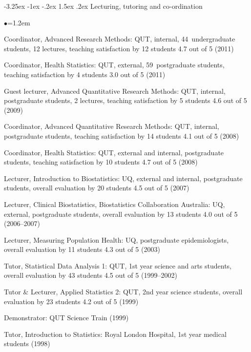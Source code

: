 \documentclass[a4paper,11pt]{article}
\makeatletter
\renewcommand\subsection{\@startsection{subsection}{2}{\z@}%
                                       {-3.25ex \@plus -1ex \@minus -.2ex}%
                                       {1.5ex \@plus .2ex}%
                                   {\normalfont\normalsize\bfseries\color{blue}}}
\renewcommand{\labelitemi}{$\bullet$}
\makeatother
\begin{document}
\begin{raggedright}
\subsection{Lecturing, tutoring and co-ordination}

\begin{list}{\labelitemi}{\leftmargin=1.2em}\addtolength{\itemsep}{-0.5\baselineskip}
\item Coordinator, Advanced Research Methods: QUT, internal, 44~undergraduate
students, 12 lectures, teaching satisfaction by 12 students 4.7 out of 5 (2011)
\item Coordinator, Health Statistics: QUT, external, 59~postgraduate
students, teaching satisfaction by 4 students 3.0 out of 5 (2011)
\item Guest lecturer, Advanced Quantitative Research Methods: QUT, internal, postgraduate
students, 2 lectures, teaching satisfaction by 5 students 4.6 out of 5 (2009)
\item Coordinator, Advanced Quantitative Research Methods: QUT, internal, postgraduate
students, teaching satisfaction by 14 students 4.1 out of 5 (2008)
\item Coordinator, Health Statistics: QUT, external and internal, postgraduate students, teaching
satisfaction by 10 students 4.7 out of 5 (2008)
\item Lecturer, Introduction to Biostatistics: UQ, external and internal, postgraduate students,
overall evaluation by 20 students 4.5 out of 5 (2007)
\item Lecturer, Clinical Biostatistics, Biostatistics Collaboration Australia: UQ, external,
postgraduate students, overall evaluation by 13 students 4.0 out of 5 (2006--2007)
\item Lecturer, Measuring Population Health: UQ, postgraduate epidemiologists, overall evaluation
by 11 students 4.3 out of 5 (2003)
\item Tutor, Statistical Data Analysis 1: QUT, 1st year science and arts students, overall evaluation
by 43 students 4.5 out of 5 (1999--2002)
\item Tutor \& Lecturer, Applied Statistics 2: QUT, 2nd year science students, overall evaluation by
23 students 4.2 out of 5 (1999)
\item Demonstrator: QUT Science Train (1999)
\item Tutor, Introduction to Statistics: Royal London Hospital, 1st year medical students (1998)
\end{list}



\end{raggedright}
\end{document}
